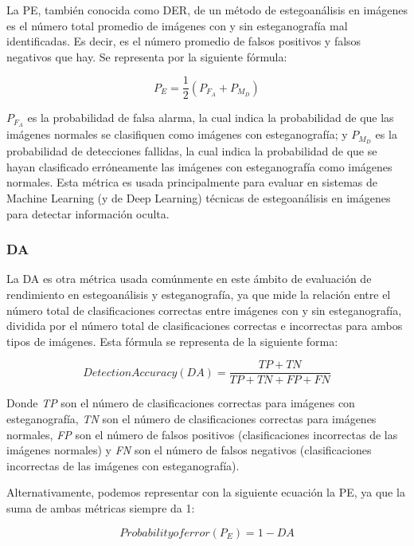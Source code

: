 La \ac{PE}, también conocida como \ac{DER}, de un método de estegoanálisis en imágenes es el número total promedio de imágenes con y sin esteganografía mal identificadas. Es decir, es el número promedio de falsos positivos y falsos negativos que hay. Se representa por la siguiente fórmula:

\begin{equation}
P_E = \frac{1}{2}(P_{F_A} + P_{M_D})
\end{equation}

\textit{$P_{F_A}$} es la probabilidad de falsa alarma, la cual indica la probabilidad de que las imágenes normales se clasifiquen como imágenes con esteganografía; y \textit{$P_{M_D}$} es la probabilidad de detecciones fallidas, la cual indica la probabilidad de que se hayan clasificado erróneamente las imágenes con esteganografía como imágenes normales. Esta métrica es usada principalmente para evaluar en sistemas de Machine Learning (y de Deep Learning) técnicas de estegoanálisis en imágenes para detectar información oculta.

\subsubsection{DA}

La \ac{DA} es otra métrica usada comúnmente en este ámbito de evaluación de rendimiento en estegoanálisis y esteganografía, ya que mide la relación entre el número total de clasificaciones correctas entre imágenes con y sin esteganografía, dividida por el número total de clasificaciones correctas e incorrectas para ambos tipos de imágenes. Esta fórmula se representa de la siguiente forma:

\begin{equation}
Detection Accuracy (DA) = \frac{TP + TN}{TP + TN + FP + FN}
\end{equation}

Donde \textit{TP} son el número de clasificaciones correctas para imágenes con esteganografía, \textit{TN} son el número de clasificaciones correctas para imágenes normales, \textit{FP} son el número de falsos positivos (clasificaciones incorrectas de las imágenes normales) y \textit{FN} son el número de falsos negativos (clasificaciones incorrectas de las imágenes con esteganografía).

Alternativamente, podemos representar con la siguiente ecuación la \ac{PE}, ya que la suma de ambas métricas siempre da 1:

\begin{equation}
Probability of error (P_E) = 1 - DA
\end{equation}

